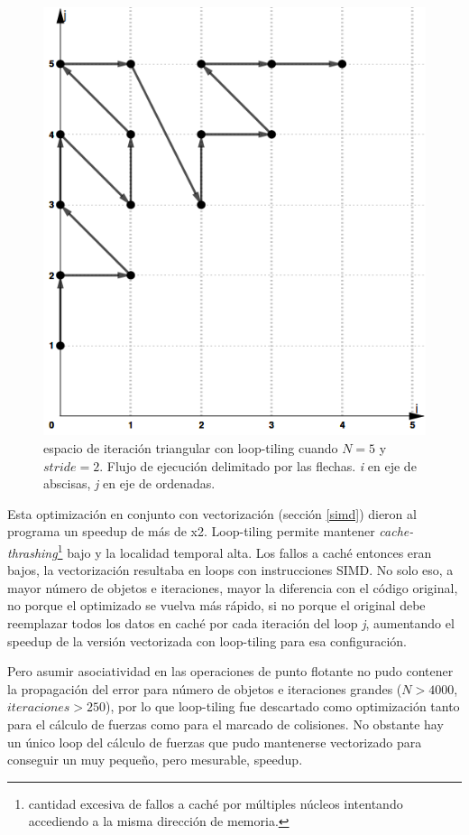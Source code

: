 \documentclass{article}
\begin{document}
\begin{figure}[h!]
	\centering
	\includegraphics[width=0.6\linewidth,height=0.6\textwidth]{resources/loop_anidado_tiling_505x565.png}
	\caption{espacio de iteración triangular con loop-tiling cuando $N=5$ y $stride=2$. Flujo de ejecución
	delimitado por las flechas. \textit{i} en eje de abscisas, \textit{j} en eje de ordenadas.}
	\label{fig:no_tiling}
\end{figure}


Esta optimización en conjunto con vectorización (sección \ref{simd}) dieron al programa un speedup de más de x2.
Loop-tiling permite mantener \textit{cache-thrashing}\footnote{cantidad excesiva de fallos a caché por múltiples núcleos intentando accediendo
a la misma dirección de memoria.} bajo y la localidad temporal alta. Los fallos a caché entonces eran bajos,
la vectorización resultaba en loops con instrucciones SIMD. No solo eso, a mayor número de objetos e iteraciones, mayor la diferencia con
el código original, no porque el optimizado se vuelva más rápido, si no porque el original debe reemplazar todos los datos en caché por cada
iteración del loop \textit{j}, aumentando el speedup de la versión vectorizada con loop-tiling para esa configuración.


Pero asumir asociatividad en las operaciones de punto flotante no pudo contener la propagación del error
para número de objetos e iteraciones grandes ($N > 4000$, $iteraciones > 250$), por lo que loop-tiling fue descartado
como optimización tanto para el cálculo de fuerzas como para el marcado de colisiones. No obstante hay un único loop del cálculo de fuerzas que pudo mantenerse vectorizado para conseguir un muy pequeño, pero
mesurable, speedup.
\end{document}
